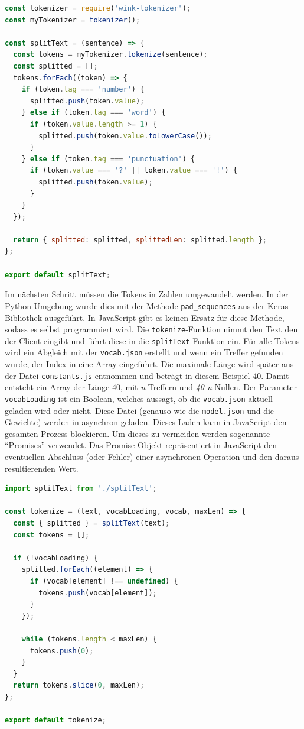 \begin{lstlisting}[language=JavaScript, caption=Die splitText Funktion, label={splitText}]
const tokenizer = require('wink-tokenizer');
const myTokenizer = tokenizer();

const splitText = (sentence) => {
  const tokens = myTokenizer.tokenize(sentence);
  const splitted = [];
  tokens.forEach((token) => {
    if (token.tag === 'number') {
      splitted.push(token.value);
    } else if (token.tag === 'word') {
      if (token.value.length >= 1) {
        splitted.push(token.value.toLowerCase());
      }
    } else if (token.tag === 'punctuation') {
      if (token.value === '?' || token.value === '!') {
        splitted.push(token.value);
      }
    }
  });

  return { splitted: splitted, splittedLen: splitted.length };
};

export default splitText;
\end{lstlisting}

Im nächsten Schritt müssen die Tokens in Zahlen umgewandelt werden. In der Python Umgebung wurde dies mit der Methode \texttt{pad\_sequences} aus der Keras-Bibliothek ausgeführt. In JavaScript gibt es keinen Ersatz für diese Methode, sodass es selbst programmiert wird. Die \texttt{tokenize}-Funktion nimmt den Text den der Client eingibt und führt diese in die \texttt{splitText}-Funktion ein. Für alle Tokens wird ein Abgleich mit der \texttt{vocab.json} erstellt und wenn ein Treffer gefunden wurde, der Index in eine Array eingeführt. Die maximale Länge wird später aus der Datei \texttt{constants.js} entnommen und beträgt in diesem Beispiel 40. Damit entsteht ein Array der Länge 40, mit \textit{n} Treffern und \textit{40-n} Nullen. Der Parameter \texttt{vocabLoading} ist ein Boolean, welches aussagt, ob die \texttt{vocab.json} aktuell geladen wird oder nicht. Diese Datei (genauso wie die \texttt{model.json} und die Gewichte) werden in asynchron geladen. Dieses Laden kann in JavaScript den gesamten Prozess blockieren. Um dieses zu vermeiden werden sogenannte \enquote{Promises} verwendet. Das Promise-Objekt repräsentiert in JavaScript den eventuellen Abschluss (oder Fehler) einer asynchronen Operation und den daraus resultierenden Wert.


\begin{lstlisting}[language=JavaScript, caption=Die tokenize Funktion, label={tokenizejs}]
import splitText from './splitText';

const tokenize = (text, vocabLoading, vocab, maxLen) => {
  const { splitted } = splitText(text);
  const tokens = [];

  if (!vocabLoading) {
    splitted.forEach((element) => {
      if (vocab[element] !== undefined) {
        tokens.push(vocab[element]);
      }
    });

    while (tokens.length < maxLen) {
      tokens.push(0);
    }
  }
  return tokens.slice(0, maxLen);
};

export default tokenize;
\end{lstlisting}

